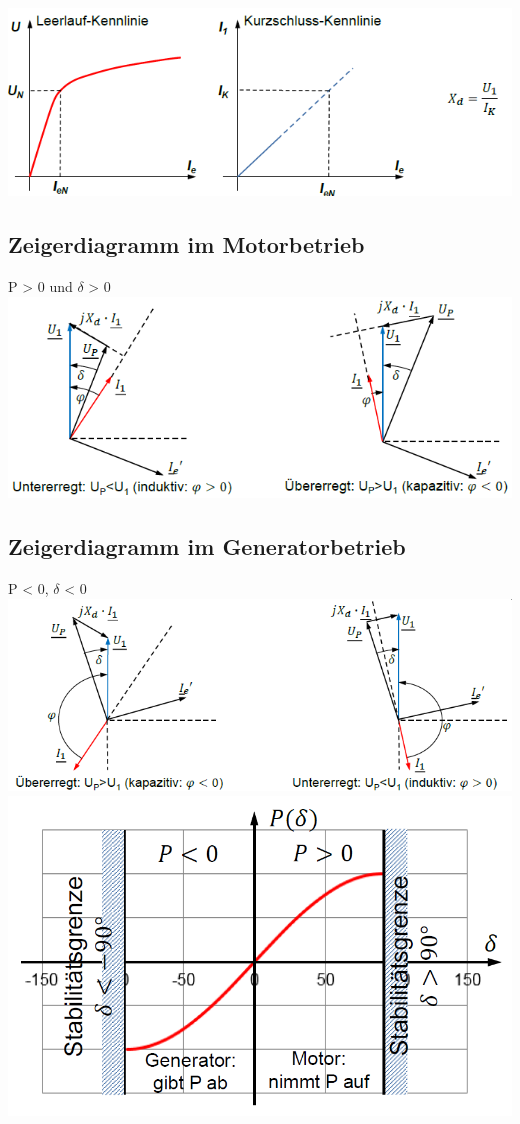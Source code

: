     \clearpage
    \newpage
    
    \includegraphics[scale = 0.8]{images/KennlinieSynchronmaschine}

\subsection{Zeigerdiagramm im Motorbetrieb}
    P > 0 und $\delta$ > 0 \newline \newline
    \includegraphics[width = 12 cm]{images/ZeigerdiagrammSynchronmaschine}

\subsection{Zeigerdiagramm im Generatorbetrieb}
    P < 0, $\delta$ < 0  \newline
    \includegraphics[width = 12 cm]{images/ZeigerdiagrammGeneratorbetrieb} \newline \newline
    \includegraphics[scale = 0.4]{images/Stabilitaet}

